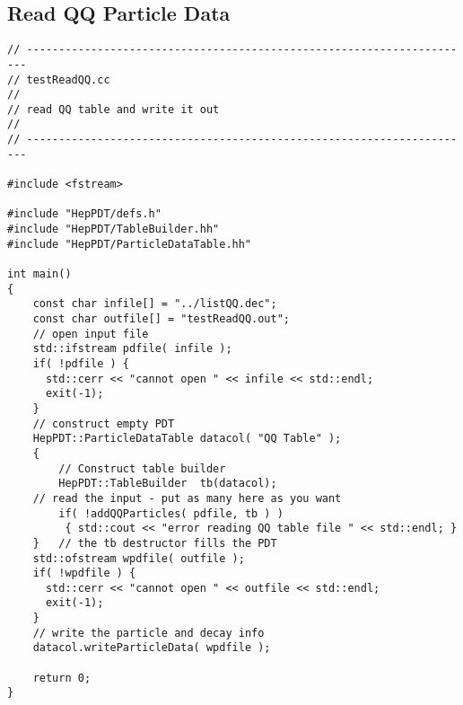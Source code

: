 \subsection { Read QQ Particle Data }
\begin{verbatim}
// ----------------------------------------------------------------------
// testReadQQ.cc
//
// read QQ table and write it out
//
// ----------------------------------------------------------------------

#include <fstream>

#include "HepPDT/defs.h"
#include "HepPDT/TableBuilder.hh"
#include "HepPDT/ParticleDataTable.hh"

int main()
{
    const char infile[] = "../listQQ.dec";
    const char outfile[] = "testReadQQ.out";
    // open input file
    std::ifstream pdfile( infile );
    if( !pdfile ) { 
      std::cerr << "cannot open " << infile << std::endl;
      exit(-1);
    }
    // construct empty PDT
    HepPDT::ParticleDataTable datacol( "QQ Table" );
    {
        // Construct table builder
        HepPDT::TableBuilder  tb(datacol);
	// read the input - put as many here as you want
        if( !addQQParticles( pdfile, tb ) ) 
	     { std::cout << "error reading QQ table file " << std::endl; }
    }	// the tb destructor fills the PDT
    std::ofstream wpdfile( outfile );
    if( !wpdfile ) { 
      std::cerr << "cannot open " << outfile << std::endl;
      exit(-1);
    }
    // write the particle and decay info
    datacol.writeParticleData( wpdfile );
    
    return 0;
}
\end{verbatim}

\vfill\eject
